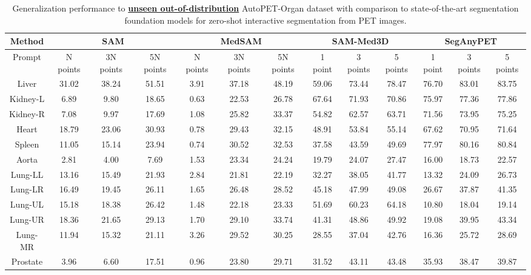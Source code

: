 \begin{table*}[h]
	\centering
    \small
    \setlength\tabcolsep{3pt}
	\renewcommand\arraystretch{1.3}
	\begin{tabular}{c|ccc|ccc|ccc|ccc}
		\hline 	\hline
Method & \multicolumn{3}{c}{SAM \cite{SAM}} & \multicolumn{3}{|c}{MedSAM \cite{MedSAM}} &  \multicolumn{3}{|c}{SAM-Med3D \cite{SAM-Med3D}}  &  \multicolumn{3}{|c}{\textbf{SegAnyPET}}   \\ \hline
Prompt & N points & 3N points & 5N points & N points & 3N points & 5N points &  1 point & 3 points & 5 points & 1 point & 3 points & 5 points \\
 \hline
Liver & 31.02 & 38.24 & 51.51 & 3.91 & 37.18 & 48.19 & 59.06 & 73.44 & 78.47 & 76.70  & 83.01 & 83.75\\ 
Kidney-L & 6.89 & 9.80 & 18.65 & 0.63 & 22.53 & 26.78 & 67.64 & 71.93 & 70.86 & 75.97  & 77.36 & 77.86 \\ 
Kidney-R & 7.08 & 9.97 & 17.69 & 1.08 & 25.82 & 33.37 & 54.82 & 62.57 & 63.71 & 71.56  & 73.95 & 75.25\\ 
Heart & 18.79 & 23.06 & 30.93 & 0.78 & 29.43 & 32.15 & 48.91 & 53.84 & 55.14 & 67.62 & 70.95 & 71.64 \\ 
Spleen & 11.05 & 15.14 & 23.94 & 0.74 & 30.52 & 32.53 & 37.58 & 43.59 & 49.69 & 77.97 & 80.16 & 80.84 \\ \hline
\rowcolor{gray!15} Aorta & 2.81 & 4.00 & 7.69 & 1.53 & 23.34 & 24.24 & 19.79 & 24.07 & 27.47 & 16.00 & 18.73 & 22.57 \\ 
\rowcolor{gray!15} Lung-LL & 13.16 & 15.49 & 21.93 & 2.84 & 21.81 & 22.19 & 32.27 & 38.05 & 41.77 & 13.32 & 24.09 & 26.73\\ 
\rowcolor{gray!15} Lung-LR & 16.49 & 19.45 & 26.11 & 1.65 & 26.48 & 28.52 & 45.18 & 47.99 & 49.08 & 26.67 & 37.87 & 41.35 \\ 
\rowcolor{gray!15} Lung-UL & 15.18 & 18.38 & 26.42 & 1.48 & 22.18 & 23.33 & 51.69 & 60.23 & 64.18 & 10.80 & 18.04 & 19.14 \\ 
\rowcolor{gray!15} Lung-UR & 18.36 & 21.65 & 29.13 & 1.70 & 29.10 & 33.74 & 41.31 & 48.86 & 49.92 & 19.08 & 39.95 & 43.34 \\ 
\rowcolor{gray!15} Lung-MR & 11.94 & 15.32 & 21.11 & 3.26 & 29.52 & 30.25 & 28.55 & 37.04 & 42.76 & 16.36 & 25.72 & 28.69 \\
\rowcolor{gray!15} Prostate & 3.96 & 6.60 & 17.51 & 0.96 & 23.80 & 29.71 & 31.52 & 43.11 & 43.48 & 35.93 & 38.47 & 39.87 \\ 
\hline \hline
	\end{tabular}
	\caption{Generalization performance to \textbf{\underline{unseen out-of-distribution}} AutoPET-Organ dataset with comparison to state-of-the-art segmentation foundation models for zero-shot interactive segmentation from PET images.} \label{Table_AutoPET}
\end{table*}




